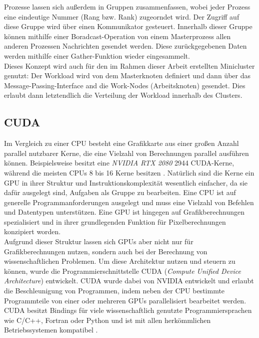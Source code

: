 \documentclass[doktyp=semarbeit, sprache=german]{TUBAFarbeiten}
\begin{document}
Prozesse lassen sich außerdem in Gruppen zusammenfassen, wobei jeder Prozess eine eindeutige Nummer (Rang bzw. Rank) zugeorndet wird. Der Zugriff auf diese Gruppe wird über einen Kommunikator gesteuert. Innerhalb dieser Gruppe können mithilfe einer Boradcast-Operation von einem Masterprozess allen anderen Prozessen Nachrichten gesendet werden. Diese zurückgegebenen Daten werden mithilfe einer Gather-Funktion wieder eingesammelt.
\\Dieses Konzept wird auch für den im Rahmen dieser Arbeit erstellten Minicluster genutzt: Der Workload wird von dem Masterknoten definiert und dann über das Message-Passing-Interface and die Work-Nodes (Arbeitsknoten) gesendet. Dies erlaubt dann letztendlich die Verteilung der Workload innerhalb des Clusters.
\subsection{CUDA}
Im Vergleich zu einer CPU besteht eine Grafikkarte aus einer großen Anzahl parallel nutzbarer Kerne, die eine Vielzahl von Berechnungen parallel ausführen können. Beispielsweise besitzt eine \textit{NVIDIA RTX 2080} 2944 CUDA-Kerne, während die meisten CPUs 8 bis 16 Kerne besitzen \cite{RTXCores}. 
Natürlich sind die Kerne ein GPU in ihrer Struktur und Instruktionskomplexität wesentlich einfacher, da sie dafür ausgelegt sind, Aufgaben als Gruppe zu bearbeiten.
Eine CPU ist auf generelle Programmanforderungen ausgelegt und muss eine Vielzahl von Befehlen und Datentypen unterstützen. Eine GPU ist hingegen auf Grafikberechnungen spezialisiert und in ihrer grundlegenden Funktion für Pixelberechnungen konzipiert worden.
\\Aufgrund dieser Struktur lassen sich GPUs aber nicht nur für Grafikberechnungen nutzen, sondern auch bei der Berechnung von wissenschaftlichen Problemen.
Um diese Architektur nutzen und steuern zu können, wurde die Programmierschnittstelle CUDA (\textit{Compute Unified Device Architecture}) entwickelt. CUDA wurde dabei von NVIDIA entwickelt und erlaubt die Beschleunigung von Programmen, indem neben der CPU bestimmte Programmteile von einer oder mehreren GPUs parallelisiert bearbeitet werden.
\\CUDA besitzt Bindings für viele wissenschaftlich genutzte Programmiersprachen wie C/C++, Fortran oder Python und ist mit allen herkömmlichen Betriebssystemen kompatibel \cite{CUDADefinition}.
\end{document}
